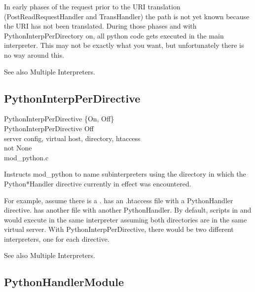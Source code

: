  In early phases of the request prior to the URI translation
(PostReadRequestHandler and TransHandler) the path is not yet known
because the URI has not been translated. During those phases and with
PythonInterpPerDirectory on, all python code gets executed in the
main interpreter. This may not be exactly what you want, but
unfortunately there is no way around this.

See also Multiple Interpreters. 

\subsection{PythonInterpPerDirective\label{dir-other-ipdv}}

PythonInterpPerDirective \{On, Off\} \\
PythonInterpPerDirective Off\\
server config, virtual host, directory, htaccess\\
not None\\
mod_python.c

Instructs mod_python to name subinterpreters using the directory in
which the Python*Handler directive currently in effect was
encountered.

For example, assume there is a
.  has an .htaccess
file with a PythonHandler directive.  
has another  file with another PythonHandler. By
default, scripts in  and
 would execute in the same interpreter
assuming both directories are in the same virtual server. With
PythonInterpPerDirective, there would be two different interpreters,
one for each directive.

See also Multiple Interpreters. 

\subsection{PythonHandlerModule\label{dir-other-phm}}

